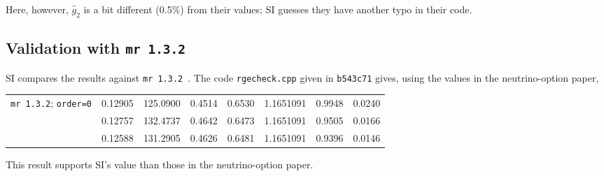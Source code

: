 \documentclass[a4paper,11pt]{scrartcl}
\numberwithin{equation}{section}
\newcommand{\rev}[1]{{\color{magenta}\texttt{#1}}}
\begin{document}
Here, however, $\hat g_2$ is a bit different (0.5\%) from their values; SI guesses they have another typo in their code.

\subsection{Validation with \texttt{mr~1.3.2}}
SI compares the results against \texttt{mr~1.3.2}~\cite{Kniehl:2016enc}. The code \texttt{rgecheck.cpp} given in \rev{b543c71} gives, using the values in the neutrino-option paper,

\begin{table}[h]\centering\small
 \begin{tabular}{c|ccccccc}
 \texttt{mr 1.3.2}; \texttt{order=0}
 & 0.12905 & 125.0900 & 0.4514 & 0.6530 & 1.1651091 & 0.9948 & 0.0240\\
 & 0.12757 & 132.4737 & 0.4642 & 0.6473 & 1.1651091 & 0.9505 & 0.0166\\
 & 0.12588 & 131.2905 & 0.4626 & 0.6481 & 1.1651091 & 0.9396 & 0.0146\\
 \end{tabular}
\end{table}

This result supports SI's value than those in the neutrino-option paper.






\end{document}
